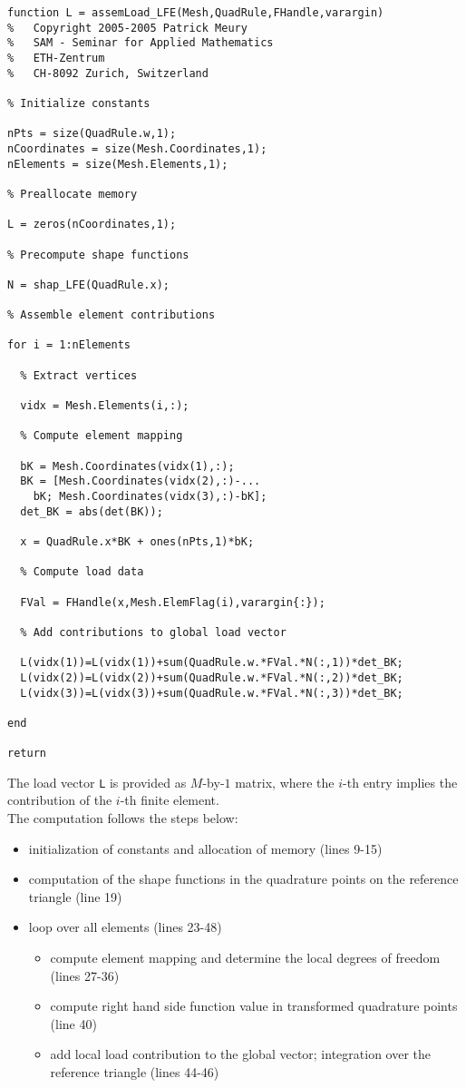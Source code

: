 \begin{lstlisting}
function L = assemLoad_LFE(Mesh,QuadRule,FHandle,varargin)
%   Copyright 2005-2005 Patrick Meury
%   SAM - Seminar for Applied Mathematics
%   ETH-Zentrum
%   CH-8092 Zurich, Switzerland
 
% Initialize constants
 
nPts = size(QuadRule.w,1);
nCoordinates = size(Mesh.Coordinates,1);
nElements = size(Mesh.Elements,1);
 
% Preallocate memory
 
L = zeros(nCoordinates,1);
 
% Precompute shape functions
 
N = shap_LFE(QuadRule.x);

% Assemble element contributions

for i = 1:nElements
  
  % Extract vertices
  
  vidx = Mesh.Elements(i,:);
   
  % Compute element mapping
  
  bK = Mesh.Coordinates(vidx(1),:);
  BK = [Mesh.Coordinates(vidx(2),:)-...
  	bK; Mesh.Coordinates(vidx(3),:)-bK];
  det_BK = abs(det(BK));
  
  x = QuadRule.x*BK + ones(nPts,1)*bK;
  
  % Compute load data
  
  FVal = FHandle(x,Mesh.ElemFlag(i),varargin{:});
  
  % Add contributions to global load vector
  
  L(vidx(1))=L(vidx(1))+sum(QuadRule.w.*FVal.*N(:,1))*det_BK;
  L(vidx(2))=L(vidx(2))+sum(QuadRule.w.*FVal.*N(:,2))*det_BK;
  L(vidx(3))=L(vidx(3))+sum(QuadRule.w.*FVal.*N(:,3))*det_BK;
    
end
  
return
\end{lstlisting}


 The load vector {\tt L} is provided as $M$-by-$1$ matrix, where the $i$-th entry implies the contribution of the $i$-th finite element. \\

 The computation follows the steps below:
 \begin{itemize}
  \item initialization of constants and allocation of memory (lines 9-15)
  \item computation of the shape functions in the quadrature points on the reference triangle (line 19)
  \item loop over all elements (lines 23-48)
  \begin{itemize}
   \item compute element mapping and determine the local degrees of freedom (lines 27-36)
   \item compute right hand side function value in transformed quadrature points (line 40)
   \item add local load contribution to the global vector; integration over the reference triangle (lines 44-46)
  \end{itemize}
 \end{itemize}

